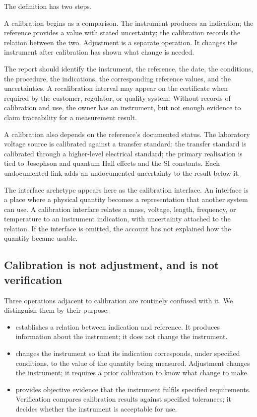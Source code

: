 The definition has two steps.

A calibration begins as a comparison. The instrument produces an
indication; the reference provides a value with stated uncertainty;
the calibration records the relation between the two. Adjustment is
a separate operation. It changes the instrument after calibration
has shown what change is needed.

The report should identify the instrument, the reference, the date,
the conditions, the procedure, the indications, the corresponding
reference values, and the uncertainties. A recalibration interval
may appear on the certificate when required by the customer,
regulator, or quality system. Without records of calibration and
use, the owner has an instrument, but not enough evidence to claim
traceability for a measurement result.

A calibration also depends on the reference's documented status. The
laboratory voltage source is calibrated against a transfer standard;
the transfer standard is calibrated through a higher-level electrical
standard; the primary realisation is tied to Josephson and quantum
Hall effects and the SI constants. Each undocumented link adds an
undocumented uncertainty to the result below it.

\begin{archetype}[Interface]
The interface archetype appears here as the calibration interface.
An interface is a place where a physical quantity becomes a
representation that another system can use. A calibration interface
relates a mass, voltage, length, frequency, or temperature to an
instrument indication, with uncertainty attached to the relation. If
the interface is omitted, the account has not explained how the
quantity became usable.
\end{archetype}

\subsection{Calibration is not adjustment, and is not verification}

Three operations adjacent to calibration are routinely confused with
it. We distinguish them by their purpose:

\begin{itemize}[leftmargin=*]
  \item {} establishes a relation between
    indication and reference. It produces information about the
    instrument; it does not change the instrument.
  \item {} changes the instrument so that its
    indication corresponds, under specified conditions, to the value
    of the quantity being measured. Adjustment changes the
    instrument; it requires a prior calibration to know what change
    to make.
  \item {} provides objective evidence that the
    instrument fulfils specified requirements. Verification
    compares calibration results against specified tolerances; it
    decides whether the instrument is acceptable for use.
\end{itemize}

